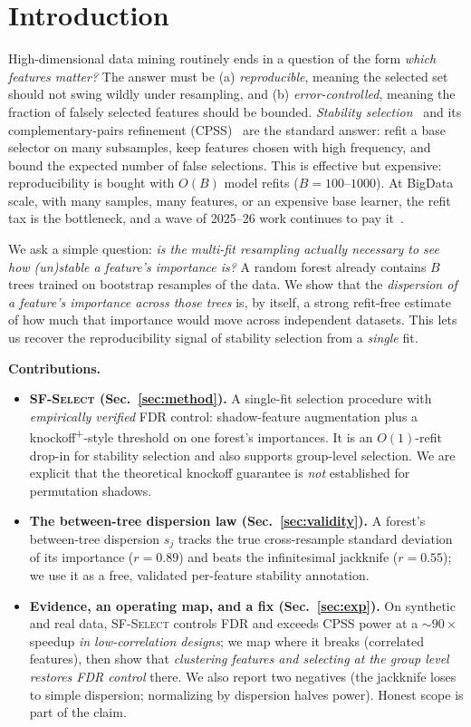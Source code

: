 \documentclass[conference]{IEEEtran}
\begin{document}
\section{Introduction}
High-dimensional data mining routinely ends in a question of the form
\emph{which features matter?} The answer must be (a) \emph{reproducible}, meaning
the selected set should not swing wildly under resampling, and (b)
\emph{error-controlled}, meaning the fraction of falsely selected features should
be bounded. \emph{Stability selection}~\cite{meinshausen2010} and its
complementary-pairs refinement (CPSS)~\cite{shah2013} are the standard answer:
refit a base selector on many subsamples, keep features chosen with high
frequency, and bound the expected number of false selections. This is effective
but expensive: reproducibility is bought with $O(B)$ model refits
($B{=}100$--$1000$). At BigData scale, with many samples, many features, or an
expensive base learner, the refit tax is the bottleneck, and a wave of
2025--26 work continues to pay it~\cite{robustmodelmaker}.

We ask a simple question: \emph{is the multi-fit resampling actually necessary
to see how (un)stable a feature's importance is?} A random forest already
contains $B$ trees trained on bootstrap resamples of the data. We show that the
\emph{dispersion of a feature's importance across those trees} is, by itself, a
strong refit-free estimate of how much that importance would move across
independent datasets. This lets us recover the reproducibility signal of
stability selection from a \emph{single} fit.

\noindent\textbf{Contributions.}
\begin{itemize}
\item \textbf{\textsc{SF-Select} (Sec.~\ref{sec:method}).} A single-fit
selection procedure with \emph{empirically verified} FDR control:
shadow-feature augmentation plus a knockoff\textsuperscript{+}-style threshold on
one forest's importances. It is an $O(1)$-refit drop-in for stability selection
and also supports group-level selection. We are explicit that the theoretical knockoff
guarantee is \emph{not} established for permutation shadows.
\item \textbf{The between-tree dispersion law (Sec.~\ref{sec:validity}).} A
forest's between-tree dispersion $s_j$ tracks the true cross-resample standard
deviation of its importance ($r{=}0.89$) and beats the infinitesimal jackknife
($r{=}0.55$); we use it as a free, validated per-feature stability annotation.
\item \textbf{Evidence, an operating map, and a fix (Sec.~\ref{sec:exp}).} On
synthetic and real data, \textsc{SF-Select} controls FDR and exceeds CPSS power
at a $\sim 90\times$ speedup \emph{in low-correlation designs}; we map where it breaks
(correlated features), then show that \emph{clustering features and selecting at
the group level restores FDR control} there. We also report two negatives (the
jackknife loses to simple dispersion; normalizing by dispersion halves power).
Honest scope is part of the claim.
\end{itemize}
\end{document}
